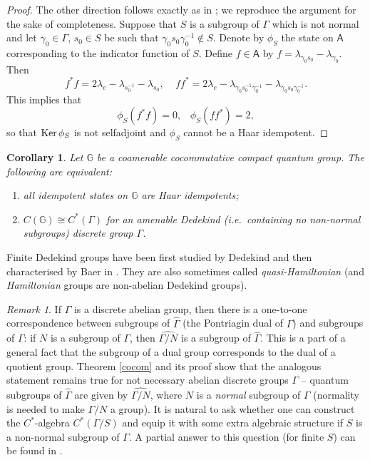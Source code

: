 \documentclass[12pt]{amsart}
\newtheorem{corollary}[theorem]{Corollary}
\theoremstyle{definition}
\theoremstyle{remark}
\newtheorem{remark}[theorem]{Remark}
\numberwithin{equation}{section}
\begin{document}
\begin{proof}
The other direction follows exactly as in \cite{franz+skalski08a}; we reproduce the argument for the sake of completeness.
    Suppose that $S$ is a subgroup of $\Gamma$ which is not normal and let $\gamma_0\in \Gamma$, $s_0 \in S$ be such that $\gamma_0 s_0 \gamma_0 ^{-1} \notin S $. Denote by $\phi_S$ the state on $\mathsf{A}$ corresponding to the indicator function of $S$. Define $f \in \mathsf{A}$ by
$f= \lambda_{\gamma_0 s_0} - \lambda_{\gamma_0}$. Then
\[
f^*f = 2 \lambda_e - \lambda_{s_0^{-1}} - \lambda_{s_0}, \;\;\;\; f f^* =  2 \lambda_e - \lambda_{\gamma_0 s_0^{-1}\gamma_0^{-1}} - \lambda_{\gamma_0 s_0 \gamma_0^{-1}}.
\]
This implies that
\[
\phi_S(f^*f) = 0,\;\;\; \phi_S(f f^*) = 2,
\]
so that ${\rm Ker}\, \phi_S$ is not selfadjoint and $\phi_S$ cannot be a Haar idempotent.
\end{proof}

\begin{corollary}
Let ${\mathbb{G}}$ be a  coamenable cocommutative compact quantum group. The following are equivalent:
\begin{enumerate}
\item all idempotent states on ${\mathbb{G}}$ are Haar idempotents; \item $C({\mathbb{G}})\cong C^*(\Gamma)$ for an amenable 
Dedekind (i.e.\ containing no non-normal subgroups) discrete group $\Gamma$.
\end{enumerate}
\end{corollary}

Finite Dedekind groups have been first studied by Dedekind and then characterised by Baer in \cite{baer66}. They 
are also sometimes called \emph{quasi-Hamiltonian} (and \emph{Hamiltonian} groups are non-abelian Dedekind 
groups).

\begin{remark}
If $\Gamma$ is a discrete abelian group, then there is a one-to-one correspondence between subgroups of 
$\hat{\Gamma}$ (the Pontriagin dual of $\Gamma$) and subgroups of $\Gamma$: if $N$ is a subgroup of $\Gamma$, 
then $\widehat{\Gamma/N}$ is a subgroup of $\hat{\Gamma}$. This is a part of a general fact that the subgroup of 
a dual group corresponds to the dual of a quotient group. Theorem \ref{cocom} and its proof show that the 
analogous statement remains true for not necessary abelian discrete groups $\Gamma$ -- quantum subgroups of 
$\hat{\Gamma}$ are given by $\widehat{\Gamma/N}$, where $N$ is a \emph{normal} subgroup of $\Gamma$ (normality is 
needed to make $\Gamma/N$ a group). It is natural to ask whether one can construct  the $C^*$-algebra 
$C^*(\Gamma/S)$ and equip it with some extra algebraic structure if $S$ is a non-normal subgroup of $\Gamma$. A 
partial answer to this question (for finite $S$) can be found in \cite{DelvauxVanDaele}.
\end{remark}
\end{document}
